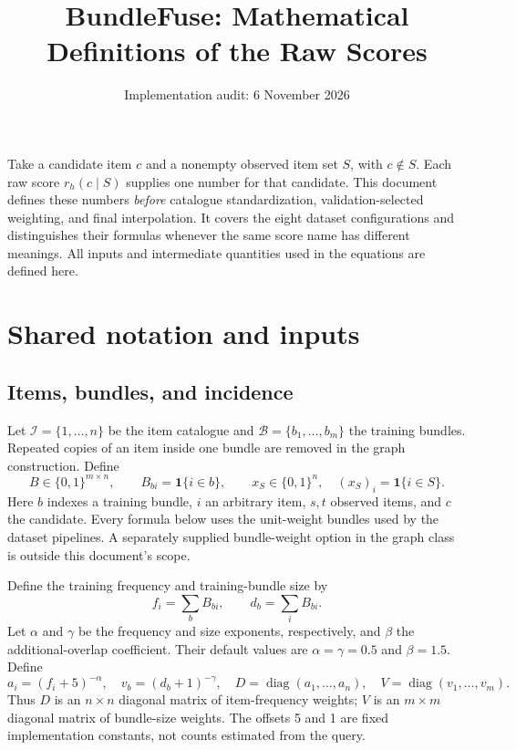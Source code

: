 \documentclass[11pt,a4paper]{article}
\title{BundleFuse: Mathematical Definitions of the Raw Scores}
\author{}
\date{Implementation audit: 6 November 2026}
\newcommand{\ind}{\mathbf 1}
\begin{document}
\maketitle

Take a candidate item $c$ and a nonempty observed item set $S$, with $c\notin S$.
Each raw score $r_h(c\mid S)$ supplies one number for that candidate.
This document defines these numbers \emph{before} catalogue standardization,
validation-selected weighting, and final interpolation. It covers the eight
dataset configurations and distinguishes their formulas whenever the same score
name has different meanings. All inputs and intermediate quantities used in the
equations are defined here.

\tableofcontents

\section{Shared notation and inputs}

\subsection{Items, bundles, and incidence}
Let $\mathcal I=\{1,\ldots,n\}$ be the item catalogue and
$\mathcal B=\{b_1,\ldots,b_m\}$ the training bundles. Repeated copies of an item
inside one bundle are removed in the graph construction. Define
\[
 B\in\{0,1\}^{m\times n},\qquad B_{bi}=\ind\{i\in b\},\qquad
 x_S\in\{0,1\}^{n},\quad (x_S)_i=\ind\{i\in S\}.
\]
Here $b$ indexes a training bundle, $i$ an arbitrary item, $s,t$ observed items,
and $c$ the candidate. Every formula below uses the unit-weight bundles used by
the dataset pipelines. A separately supplied bundle-weight option in the graph
class is outside this document's scope.

Define the training frequency and training-bundle size by
\[
 f_i=\sum_b B_{bi},\qquad d_b=\sum_iB_{bi}.
\]
Let $\alpha$ and $\gamma$ be the frequency and size exponents, respectively,
and $\beta$ the additional-overlap coefficient. Their default values are
$\alpha=\gamma=0.5$ and $\beta=1.5$. Define
\[
 a_i=(f_i+5)^{-\alpha},\quad v_b=(d_b+1)^{-\gamma},\quad
 D=\operatorname{diag}(a_1,\ldots,a_n),\quad
 V=\operatorname{diag}(v_1,\ldots,v_m).
\]
Thus $D$ is an $n\times n$ diagonal matrix of item-frequency weights; $V$ is an
$m\times m$ diagonal matrix of bundle-size weights. The offsets 5 and 1 are
fixed implementation constants, not counts estimated from the query.
\end{document}
